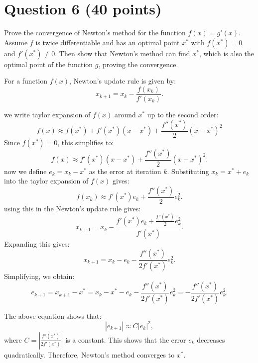 \section{Question 6 (40 points)}
Prove the convergence of Newton's method for the function \( f(x) = g'(x) \). Assume \( f \) is twice differentiable and has an optimal point \( x^* \) with \( f(x^*) = 0 \) and \( f'(x^*) \neq 0 \). Then show that Newton's method can find \( x^* \), which is also the optimal point of the function \( g \), proving the convergence.
\begin{qsolve}
	\begin{qsolve}[]
		For a function \( f(x) \), Newton's update rule is given by:
		\[
		x_{k+1} = x_k - \frac{f(x_k)}{f'(x_k)}.
		\]

		we write taylor expansion of \( f(x) \) around \( x^* \) up to the second order:
		\[
		f(x) \approx f(x^*) + f'(x^*)(x - x^*) + \frac{f''(x^*)}{2}(x - x^*)^2
		\]
		Since \( f(x^*) = 0 \), this simplifies to:
		\[
		f(x) \approx f'(x^*)(x - x^*) + \frac{f''(x^*)}{2}(x - x^*)^2.
		\]
		now we define \( e_k = x_k - x^* \) as the error at iteration \( k \). Substituting \( x_k = x^* + e_k \) into the taylor expansion of \( f(x) \) gives:
		\[
		f(x_k) \approx f'(x^*) e_k + \frac{f''(x^*)}{2} e_k^2.
		\]
		using this in the Newton's update rule gives:
		\[
		x_{k+1} = x_k - \frac{f'(x^*) e_k + \frac{f''(x^*)}{2} e_k^2}{f'(x^*)}.
		\]
		Expanding this gives:
		\[
		x_{k+1} = x_k - e_k - \frac{f''(x^*)}{2 f'(x^*)} e_k^2.
		\]
		Simplifying, we obtain:
		\[
		e_{k+1} = x_{k+1} - x^* = x_k - x^* - e_k - \frac{f''(x^*)}{2 f'(x^*)} e_k^2= -\frac{f''(x^*)}{2 f'(x^*)} e_k^2.
		\]

		The above equation shows that:
		\[
		|e_{k+1}| \approx C |e_k|^2,
		\]
		where \( C = \left| \frac{f''(x^*)}{2 f'(x^*)} \right| \) is a constant. This shows that the error \(e_k \) decreases quadratically. Therefore, Newton's method converges to \( x^* \).
	\end{qsolve}
\end{qsolve}